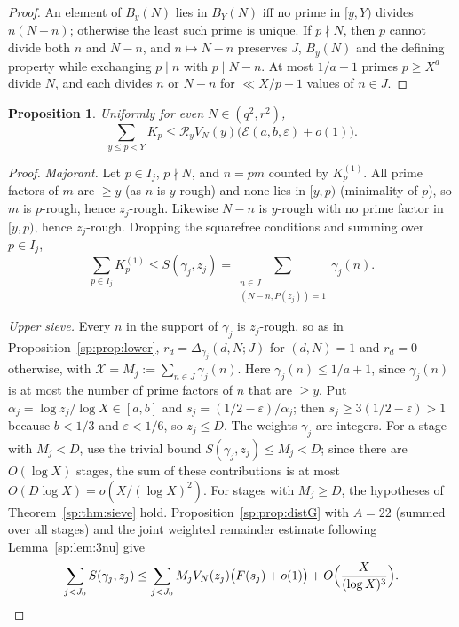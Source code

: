\documentclass[final,11pt]{elsarticle}
\newtheorem{proposition}[theorem]{Proposition}
\theoremstyle{definition}
\theoremstyle{remark}
\newcommand{\R}{\mathcal R}
\newcommand{\E}{\mathcal E}
\numberwithin{equation}{section}
\begin{document}
\begin{proof}
An element of $B_y(N)$ lies in $B_Y(N)$ iff no prime in $[y,Y)$ divides
$n(N-n)$; otherwise the least such prime is unique. If $p\nmid N$, then $p$
cannot divide both $n$ and $N-n$, and $n\mapsto N-n$ preserves $J$, $B_y(N)$
and the defining property while exchanging $p\mid n$ with $p\mid N-n$. At most
$1/a+1$ primes $p\ge X^a$ divide $N$, and each divides $n$ or $N-n$ for
$\ll X/p+1$ values of $n\in J$.
\end{proof}

\begin{proposition}\label{sp:prop:upper}
Uniformly for even $N\in(q^2,r^2)$,
\[
\sum_{y\le p<Y}K_p\le\R_yV_N(y)\bigl(\E(a,b,\varepsilon)+o(1)\bigr).
\]
\end{proposition}

\begin{proof}
\emph{Majorant.} Let $p\in I_j$, $p\nmid N$, and $n=pm$ counted by $K_p^{(1)}$.
All prime factors of $m$ are $\ge y$ (as $n$ is $y$-rough) and none lies in
$[y,p)$ (minimality of $p$), so $m$ is $p$-rough, hence $z_j$-rough. Likewise
$N-n$ is $y$-rough with no prime factor in $[y,p)$, hence $z_j$-rough. Dropping
the squarefree conditions and summing over $p\in I_j$,
\[
 \sum_{p\in I_j}K_p^{(1)}\le S(\gamma_j,z_j)
 =\sum_{\substack{n\in J\\(N-n,P(z_j))=1}}\gamma_j(n).
\]

\emph{Upper sieve.} Every $n$ in the support of $\gamma_j$ is $z_j$-rough, so as
in Proposition~\ref{sp:prop:lower}, $r_d=\Delta_{\gamma_j}(d,N;J)$ for $(d,N)=1$ and
$r_d=0$ otherwise, with $\mathcal X=M_j:=\sum_{n\in J}\gamma_j(n)$. Here
$\gamma_j(n)\le1/a+1$, since $\gamma_j(n)$ is at most the number of prime factors
of $n$ that are $\ge y$. Put $\alpha_j=\log z_j/\log X\in[a,b]$ and
$s_j=(1/2-\varepsilon)/\alpha_j$; then $s_j\ge3(1/2-\varepsilon)>1$ because $b<1/3$
and $\varepsilon<1/6$, so $z_j\le D$. The weights $\gamma_j$ are integers.
For a stage with $M_j<D$, use the trivial bound
$S(\gamma_j,z_j)\le M_j<D$; since there are $O(\log X)$ stages,
the sum of these contributions is at most $O(D\log X)
=o(X/(\log X)^2)$. For stages with $M_j\ge D$, the hypotheses
of Theorem~\ref{sp:thm:sieve} hold. Proposition~\ref{sp:prop:distG}
with $A=22$ (summed over all stages) and the joint weighted
remainder estimate following Lemma~\ref{sp:lem:3nu} give
\[
 \sum_{j<J_0}S(\gamma_j,z_j)\le\sum_{j<J_0}M_jV_N(z_j)\bigl(F(s_j)+o(1)\bigr)+O\Bigl(\frac{X}{(\log X)^3}\Bigr).
\]


\end{proof}
\end{document}
